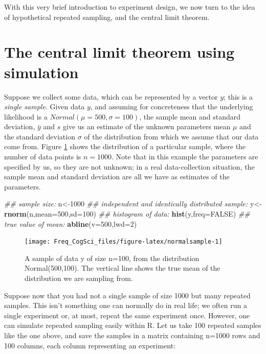 \documentclass[12pt,]{krantz}
\newenvironment{Shaded}{\begin{snugshade}}{\end{snugshade}}
\newcommand{\CommentTok}[1]{\textcolor[rgb]{0.56,0.35,0.01}{\textit{#1}}}
\newcommand{\DataTypeTok}[1]{\textcolor[rgb]{0.13,0.29,0.53}{#1}}
\newcommand{\DecValTok}[1]{\textcolor[rgb]{0.00,0.00,0.81}{#1}}
\newcommand{\KeywordTok}[1]{\textcolor[rgb]{0.13,0.29,0.53}{\textbf{#1}}}
\newcommand{\NormalTok}[1]{#1}
\newcommand{\OtherTok}[1]{\textcolor[rgb]{0.56,0.35,0.01}{#1}}
\begin{document}
With this very brief introduction to experiment design, we now turn to the idea of hypothetical repeated sampling, and the central limit theorem.

\hypertarget{the-central-limit-theorem-using-simulation}{%
\section{The central limit theorem using simulation}\label{the-central-limit-theorem-using-simulation}}

Suppose we collect some data, which can be represented by a vector \(y\); this is a \emph{single sample}. Given data \(y\), and assuming for concreteness that the underlying likelihood is a \(Normal(\mu=500,\sigma=100)\), the sample mean and standard deviation, \(\bar{y}\) and \(s\) give us an estimate of the unknown parameters mean \(\mu\) and the standard deviation \(\sigma\) of the distribution from which we assume that our data come from. Figure \ref{fig:normalsample} shows the distribution of a particular sample, where the number of data points is \(n=1000\). Note that in this example the parameters are specified by us, so they are not unknown; in a real data-collection situation, the sample mean and standard deviation are all we have as estimates of the parameters.

\begin{Shaded}
\begin{Highlighting}[]
\CommentTok{## sample size:}
\NormalTok{n<-}\DecValTok{1000}
\CommentTok{##  independent and identically distributed sample:}
\NormalTok{y<-}\KeywordTok{rnorm}\NormalTok{(n,}\DataTypeTok{mean=}\DecValTok{500}\NormalTok{,}\DataTypeTok{sd=}\DecValTok{100}\NormalTok{)}
\CommentTok{## histogram of data:}
\KeywordTok{hist}\NormalTok{(y,}\DataTypeTok{freq=}\OtherTok{FALSE}\NormalTok{)}
\CommentTok{## true value of mean:}
\KeywordTok{abline}\NormalTok{(}\DataTypeTok{v=}\DecValTok{500}\NormalTok{,}\DataTypeTok{lwd=}\DecValTok{2}\NormalTok{)}
\end{Highlighting}
\end{Shaded}

\begin{figure}
\texttt{[image: Freq\_CogSci\_files/figure-latex/normalsample-1]} \caption{A sample of data y of size n=100, from the distribution  Normal(500,100). The vertical line shows the true mean of the distribution we are sampling from.}\label{fig:normalsample}
\end{figure}

Suppose now that you had not a single sample of size 1000 but many repeated samples. This isn't something one can normally do in real life; we often run a single experiment or, at most, repeat the same experiment once. However, one can simulate repeated sampling easily within R. Let us take 100 repeated samples like the one above, and save the samples in a matrix containing n=1000 rows and 100 columns, each column representing an experiment:
\end{document}
